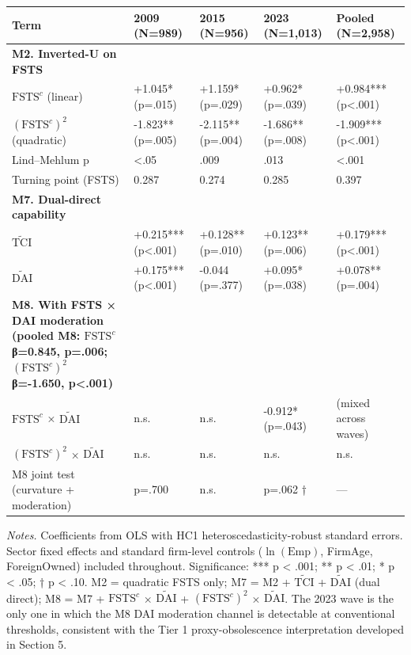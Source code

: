 \documentclass[12pt,a4paper]{article}
\begin{document}
\begin{longtable}[]{@{}lllll@{}}
\toprule\noalign{}
Term & 2009 (N=989) & 2015 (N=956) & 2023 (N=1,013) & Pooled
(N=2,958) \\
\midrule\noalign{}
\endhead
\bottomrule\noalign{}
\endlastfoot
\textbf{M2. Inverted-U on FSTS} & & & & \\
\(\mathrm{FSTS}^{c}\) (linear) & +1.045* (p=.015) & +1.159* (p=.029) &
+0.962* (p=.039) & +0.984*** (p\textless.001) \\
\((\mathrm{FSTS}^{c})^2\) (quadratic) & -1.823** (p=.005) & -2.115**
(p=.004) & -1.686** (p=.008) & -1.909*** (p\textless.001) \\
Lind--Mehlum p & \textless.05 & .009 & .013 & \textless.001 \\
Turning point (FSTS) & 0.287 & 0.274 & 0.285 & 0.397 \\
\textbf{M7. Dual-direct capability} & & & & \\
\(\tilde{\mathrm{TCI}}\) & +0.215*** (p\textless.001) & +0.128**
(p=.010) & +0.123** (p=.006) & +0.179*** (p\textless.001) \\
\(\tilde{\mathrm{DAI}}\) & +0.175*** (p\textless.001) & -0.044 (p=.377)
& +0.095* (p=.038) & +0.078** (p=.004) \\
\textbf{M8. With FSTS × DAI moderation (pooled M8: \(\mathrm{FSTS}^{c}\)
β=0.845, p=.006; \((\mathrm{FSTS}^{c})^2\) β=-1.650, p\textless.001)} &
& & & \\
\(\mathrm{FSTS}^{c}\) × \(\tilde{\mathrm{DAI}}\) & n.s. & n.s. & -0.912*
(p=.043) & (mixed across waves) \\
\((\mathrm{FSTS}^{c})^2\) × \(\tilde{\mathrm{DAI}}\) & n.s. & n.s. &
n.s. & n.s. \\
M8 joint test (curvature + moderation) & p=.700 & n.s. & p=.062 † &
--- \\
\end{longtable}

\emph{Notes.} Coefficients from OLS with HC1 heteroscedasticity-robust
standard errors. Sector fixed effects and standard firm-level controls
(\(\ln(\mathrm{Emp})\), FirmAge, ForeignOwned) included throughout.
Significance: *** p \textless{} .001; ** p \textless{} .01; * p
\textless{} .05; † p \textless{} .10. M2 = quadratic FSTS only; M7 = M2
+ \(\tilde{\mathrm{TCI}}\) + \(\tilde{\mathrm{DAI}}\) (dual direct); M8
= M7 + \(\mathrm{FSTS}^{c}\) × \(\tilde{\mathrm{DAI}}\) +
\((\mathrm{FSTS}^{c})^2\) × \(\tilde{\mathrm{DAI}}\). The 2023 wave is
the only one in which the M8 DAI moderation channel is detectable at
conventional thresholds, consistent with the Tier 1 proxy-obsolescence
interpretation developed in Section 5.
\end{document}
